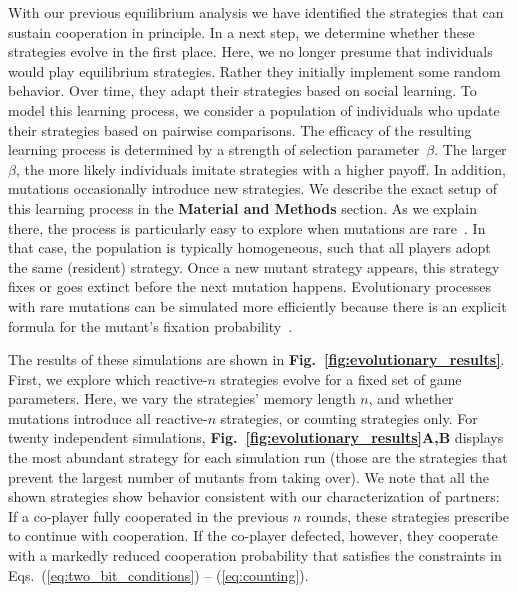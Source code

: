 \documentclass[9pt,twocolumn,twoside]{pnas-new}
\newcommand{\figref}[1]{{\textbf{Fig.~\ref{#1}}}}
\def\methods{\textbf{Material and Methods}}
\begin{document}
With our previous equilibrium analysis we have identified the strategies that can sustain cooperation in principle. 
In a next step, we determine whether these strategies evolve in the first place. 
Here, we no longer presume that individuals would play equilibrium strategies. 
Rather they initially implement some random behavior. 
Over time, they adapt their strategies based on social learning.
To model this learning process, we consider a population of individuals who update their strategies based on pairwise comparisons. 
The efficacy of the resulting learning process is determined by a strength of selection parameter~$\beta$. 
The larger $\beta$, the more likely individuals imitate strategies with a higher payoff. 
In addition, mutations occasionally introduce new strategies.
We describe the exact setup of this learning process in the \methods{} section.
As we explain there, the process is particularly easy to explore when mutations are rare~\cite{fudenberg:JET:2006,wu:JMB:2012,imhof:royal:2010,mcavoy:jet:2015}. 
In that case, the population is typically homogeneous, such that all players adopt the same (resident) strategy.   
Once a new mutant strategy appears, this strategy fixes or goes extinct before the next mutation happens. 
Evolutionary processes with rare mutations can be simulated more efficiently because there is an explicit formula for the mutant's fixation probability~\citep{nowak:Nature:2004}. 

The results of these simulations are shown in \figref{fig:evolutionary_results}. 
First, we explore which reactive-$n$ strategies evolve for a fixed set of game parameters. 
Here, we vary the strategies' memory length $n$, and whether mutations introduce all reactive-$n$ strategies, or counting strategies only. 
For twenty independent simulations, \figref{fig:evolutionary_results}\textbf{A,B} displays the most abundant strategy for each simulation run (those are the strategies that prevent the largest number of mutants from taking over). 
We note that all the shown strategies show behavior consistent with our characterization of partners: 
If a co-player fully cooperated in the previous $n$ rounds, these strategies prescribe to continue with cooperation. 
If the co-player defected, however, they cooperate with a markedly reduced cooperation probability that satisfies the constraints in Eqs.~(\ref{eq:two_bit_conditions}) -- (\ref{eq:counting}).
\end{document}
